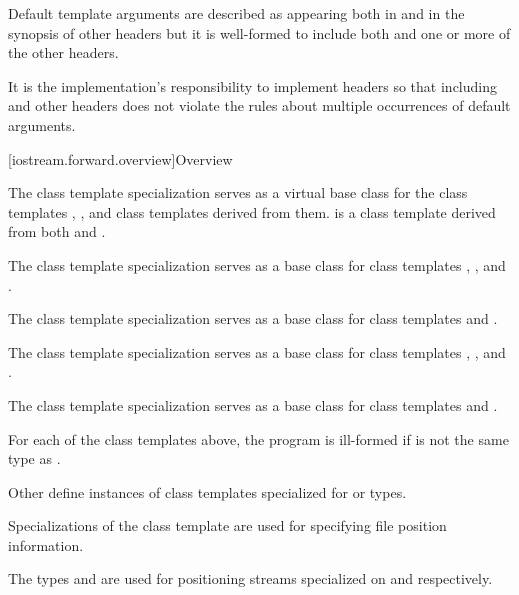 \pnum
Default template arguments are described as appearing both in
and in the synopsis of other headers
but it is well-formed to include both
and one or more of the other headers.
\begin{footnote}
It is the implementation's
responsibility to implement headers so
that including 
and other headers does not violate the rules about
multiple occurrences of default arguments.
\end{footnote}

[iostream.forward.overview]{Overview}

\pnum
The
class template specialization
serves as a virtual base class for the
class templates
,
,
and
class templates
derived from them.
is a class
template
derived from both
and
.

\pnum
The
class template specialization
serves as a base class for class templates
,
,
and
.

\pnum
The
class template specialization
serves as a base class for class templates
and
.

\pnum
The
class template specialization
serves as a base class for class templates
,
,
and
.

\pnum
The
class template specialization
serves as a base class for class templates
and
.

\pnum
\begin{note}
For each of the class templates above,
the program is ill-formed if
is not the same type as
.
\end{note}

\pnum
Other  define instances of
class templates
specialized for
or
types.

\pnum
Specializations of the class template
are
used for specifying file position information.
\begin{example}
The types
and
are used for positioning streams specialized on
and
respectively.
\end{example}

